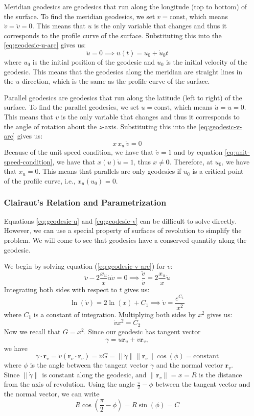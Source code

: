 \documentclass[12pt]{article}
\begin{document}
Meridian geodesics are geodesics that run along the longitude (top to bottom) of the surface.
To find the meridian geodesics, we set $v = \text{const}$, which means $\dot{v} = \ddot{v} = 0$.
This means that $u$ is the only variable that changes and thus it corresponds to the profile curve of the surface.
Substituting this into the \eqref{eq:geodesic-u-arc} gives us:
\[
	\ddot{u} = 0 \implies u(t) = u_0 + \dot{u}_0 t
\]
where \(u_0\) is the initial position of the geodesic and \(\dot{u}_0\) is the initial velocity of the geodesic.
This means that the geodesics along the meridian are straight lines in the \(u\) direction, which is the same as the profile curve of the surface.

Parallel geodesics are geodesics that run along the latitude (left to right) of the surface.
To find the parallel geodesics, we set $u = \text{const}$, which means $\dot{u} = \ddot{u} = 0$.
This means that $v$ is the only variable that changes and thus it corresponds to the angle of rotation about the $z$-axis.
Substituting this into the \eqref{eq:geodesic-v-arc} gives us:
\[
	x \, x_{u} \, \ddot{v} = 0 
\]
Because of the unit speed condition, we have that \(\dot{v} = 1 \) and by equation \eqref{eq:unit-speed-condition}, we have that $x(u)\dot{u} = 1$, thus $x \neq 0$.
Therefore, at $u_0$, we have that $x_{u} = 0$. 
This means that parallels are only geodesics if $u_0$ is a critical point of the profile curve, i.e., $x_{u}(u_0) = 0$.
\endgroup

\subsubsection{Clairaut’s Relation and Parametrization}

Equations \eqref{eq:geodesic-u} and \eqref{eq:geodesic-v} can be difficult to solve directly.
However, we can use a special property of surfaces of revolution to simplify the problem.
We will come to see that geodesics have a conserved quantity along the geodesic.

We begin by solving equation (\ref{eq:geodesic-v-arc}) for \(v\):
\[
\ddot{v} - 2\frac{x_{u}}{x}\dot{u}\dot{v} = 0 \implies \frac{\ddot{v}}{\dot{v}} = 2\frac{x_{u}}{x}\dot{u}
\]
Integrating both sides with respect to \(t\) gives us:
\[
\ln(\dot{v}) = 2\ln(x) + C_1 \implies \dot{v} = \frac{e^{C_1}}{x^2}
\]
where \(C_1\) is a constant of integration.
Multiplying both sides by \(x^2\) gives us:
\[
\dot{v} x^2 = C_2
\]
Now we recall that \(G = x^2\). 
Since our geodesic has tangent vector 
\[
\dot{\gamma} = \dot{u}\mathbf{r}_u + \dot{v}\mathbf{r}_v,
\]
we have 
\[
	\dot{\gamma} \cdot \mathbf{r}_v = \dot{v} (\mathbf{r}_v \cdot \mathbf{r}_v) = \dot{v} G = \|\dot{\gamma}\|\|\mathbf{r}_v\|\cos(\phi) = \text{constant}
\]
where \(\phi\) is the angle between the tangent vector \(\dot{\gamma}\) and the normal vector \(\mathbf{r}_v\).
Since \(\|\dot{\gamma}\|\) is constant along the geodesic, and \(\|\mathbf{r}_v\| = x = R\) is the distance from the axis of revolution.
Using the angle \(\frac{\pi}{2} - \phi\) between the tangent vector and the normal vector, we can write
\[
R\cos(\frac{\pi}{2} - \phi) = R\sin(\phi) = C
\]
\end{document}
